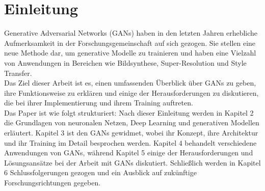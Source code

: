 \chapter{Einleitung}

\noindent Generative Adversarial Networks (GANs) haben in den letzten Jahren erhebliche Aufmerksamkeit in der Forschungsgemeinschaft auf sich gezogen. Sie stellen eine neue Methode dar, um generative Modelle zu trainieren und haben eine Vielzahl von Anwendungen in Bereichen wie Bildsynthese, Super-Resolution und Style Transfer. \\

\noindent Das Ziel dieser Arbeit ist es, einen umfassenden Überblick über GANs zu geben, ihre Funktionsweise zu erklären und einige der Herausforderungen zu diskutieren, die bei ihrer Implementierung und ihrem Training auftreten. \\

\noindent Das Paper ist wie folgt strukturiert: Nach dieser Einleitung werden in Kapitel 2 die Grundlagen von neuronalen Netzen, Deep Learning und generativen Modellen erläutert. Kapitel 3 ist den GANs gewidmet, wobei ihr Konzept, ihre Architektur und ihr Training im Detail besprochen werden. Kapitel 4 behandelt verschiedene Anwendungen von GANs, während Kapitel 5 einige der Herausforderungen und Lösungsansätze bei der Arbeit mit GANs diskutiert. Schließlich werden in Kapitel 6 Schlussfolgerungen gezogen und ein Ausblick auf zukünftige Forschungsrichtungen gegeben. \\

